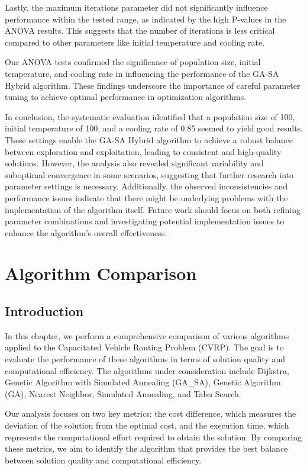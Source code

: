 \documentclass{article}
\begin{document}
    Lastly, the maximum iterations parameter did not significantly influence performance within the tested range, as indicated by the high P-values in the ANOVA results. This suggests that the number of iterations is less critical compared to other parameters like initial temperature and cooling rate.

    Our ANOVA tests confirmed the significance of population size, initial temperature, and cooling rate in influencing the performance of the GA-SA Hybrid algorithm. These findings underscore the importance of careful parameter tuning to achieve optimal performance in optimization algorithms.

    In conclusion, the systematic evaluation identified that a population size of 100, initial temperature of 100, and a cooling rate of 0.85 seemed to yield good results. These settings enable the GA-SA Hybrid algorithm to achieve a robust balance between exploration and exploitation, leading to consistent and high-quality solutions. However, the analysis also revealed significant variability and suboptimal convergence in some scenarios, suggesting that further research into parameter settings is necessary. Additionally, the observed inconsistencies and performance issues indicate that there might be underlying problems with the implementation of the algorithm itself. Future work should focus on both refining parameter combinations and investigating potential implementation issues to enhance the algorithm's overall effectiveness.


    \section{Algorithm Comparison}

    \subsection{Introduction}

    In this chapter, we perform a comprehensive comparison of various algorithms applied to the Capacitated Vehicle Routing Problem (CVRP). The goal is to evaluate the performance of these algorithms in terms of solution quality and computational efficiency. The algorithms under consideration include Dijkstra, Genetic Algorithm with Simulated Annealing (GA\_SA), Genetic Algorithm (GA), Nearest Neighbor, Simulated Annealing, and Tabu Search.

    Our analysis focuses on two key metrics: the cost difference, which measures the deviation of the solution from the optimal cost, and the execution time, which represents the computational effort required to obtain the solution. By comparing these metrics, we aim to identify the algorithm that provides the best balance between solution quality and computational efficiency.
\end{document}
